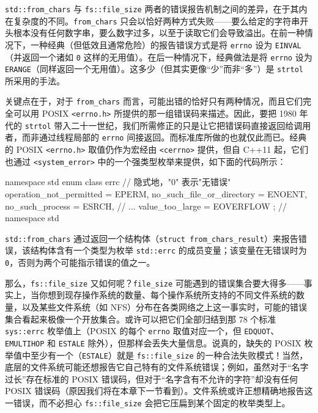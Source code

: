 \texttt{std::\allowbreak{}from\_\allowbreak{}chars} 与 \texttt{fs::\allowbreak{}file\_\allowbreak{}size} 两者的错误报告机制之间的差异，在于其内在复杂度的不同。\texttt{from\_\allowbreak{}chars} 只会以恰好两种方式失败——要么给定的字符串开头根本没有任何数字串，要么数字过多，以至于读取它们会导致溢出。在前一种情况下，一种经典（但低效且通常危险）的报告错误方式是将 \texttt{errno} 设为 \texttt{EINVAL}（并返回一个诸如 \texttt{0} 这样的无用值）。在后一种情况下，经典做法是将 \texttt{errno} 设为 \texttt{ERANGE}（同样返回一个无用值）。这多少（但其实更像“少”而非“多”）是 \texttt{strtol} 所采用的手法。

关键点在于，对于 \texttt{from\_\allowbreak{}chars} 而言，可能出错的恰好只有两种情况，而且它们完全可以用 POSIX \texttt{<errno.\allowbreak{}h>\allowbreak{}} 所提供的那一组错误码来描述。因此，要把 1980 年代的 \texttt{strtol} 带入二十一世纪，我们所需修正的只是让它把错误码直接返回给调用者，而非通过线程局部的 \texttt{errno} 间接返回。而标准库所做的也就仅此而已。经典的 POSIX \texttt{<errno.\allowbreak{}h>\allowbreak{}} 取值仍作为宏经由 \texttt{<cerrno>\allowbreak{}} 提供，但自 C++11 起，它们也通过 \texttt{<system\_\allowbreak{}error>\allowbreak{}} 中的一个强类型枚举来提供，如下面的代码所示：

\begin{codebox}[cpp]
  namespace std {
    enum class errc {
      // 隐式地，"0" 表示"无错误"
      operation_not_permitted = EPERM,
      no_such_file_or_directory = ENOENT,
      no_such_process = ESRCH,
      // ...
      value_too_large = EOVERFLOW
    };
  } // namespace std
\end{codebox}

\texttt{std::\allowbreak{}from\_\allowbreak{}chars} 通过返回一个结构体（\texttt{struct from\_\allowbreak{}chars\_\allowbreak{}result}）来报告错误，该结构体含有一个类型为枚举 \texttt{std::\allowbreak{}errc} 的成员变量；该变量在无错误时为 \texttt{0}，否则为两个可能指示错误的值之一。

那么，\texttt{fs::\allowbreak{}file\_\allowbreak{}size} 又如何呢？\texttt{file\_\allowbreak{}size} 可能遇到的错误集合要大得多——事实上，当你想到现存操作系统的数量、每个操作系统所支持的不同文件系统的数量，以及某些文件系统（如 NFS）分布在各类网络之上这一事实时，可能的错误集合看起来极像一个开放集合。或许可以把它们全部归结到那 78 个标准 \texttt{sys::\allowbreak{}errc} 枚举值上（POSIX 的每个 \texttt{errno} 取值对应一个，但 \texttt{EDQUOT}、\texttt{EMULTIHOP} 和 \texttt{ESTALE} 除外），但那样会丢失大量信息。说真的，缺失的 POSIX 枚举值中至少有一个（\texttt{ESTALE}）就是 \texttt{fs::\allowbreak{}file\_\allowbreak{}size} 的一种合法失败模式！当然，底层的文件系统可能还想报告它自己特有的文件系统错误；例如，虽然对于“名字过长”存在标准的 POSIX 错误码，但对于“名字含有不允许的字符”却没有任何 POSIX 错误码（原因我们将在本章下一节看到）。文件系统或许正想精确地报告这一错误，而不必担心 \texttt{fs::\allowbreak{}file\_\allowbreak{}size} 会把它压扁到某个固定的枚举类型上。


